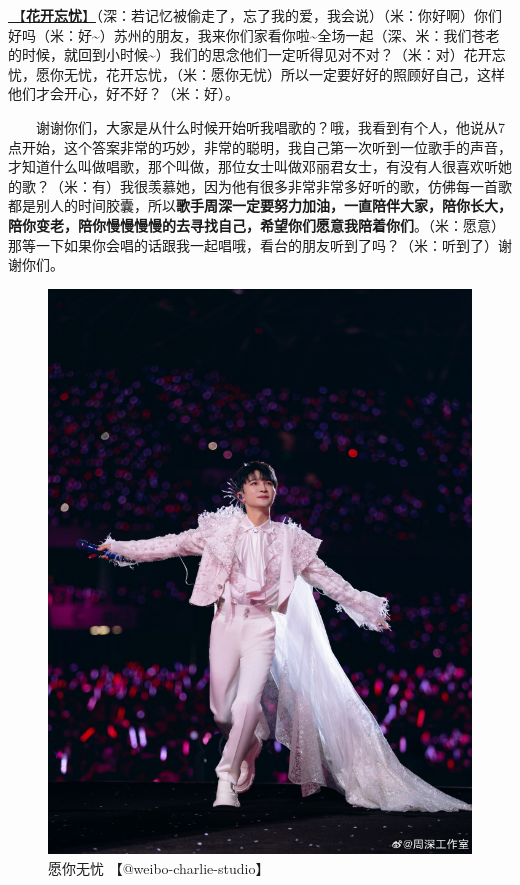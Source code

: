\documentclass[]{ctexbook}
\begin{document}
\hyperref[no-worries]{🎵【\textbf{花开忘忧}】}（深：若记忆被偷走了，忘了我的爱，我会说）（米：你好啊）你们好吗（米：好\textasciitilde）苏州的朋友，我来你们家看你啦\textasciitilde 全场一起（深、米：我们苍老的时候，就回到小时候\textasciitilde）我们的思念他们一定听得见对不对？（米：对）花开忘忧，愿你无忧，花开忘忧，（米：愿你无忧）所以一定要好好的照顾好自己，这样他们才会开心，好不好？（米：好）。

  谢谢你们，大家是从什么时候开始听我唱歌的？哦，我看到有个人，他说从7点开始，这个答案非常的巧妙，非常的聪明，我自己第一次听到一位歌手的声音，才知道什么叫做唱歌，那个叫做，那位女士叫做邓丽君女士，有没有人很喜欢听她的歌？（米：有）我很羡慕她，因为他有很多非常非常多好听的歌，仿佛每一首歌都是别人的时间胶囊，所以\textbf{歌手周深一定要努力加油，一直陪伴大家，陪你长大，陪你变老，陪你慢慢慢慢的去寻找自己，希望你们愿意我陪着你们}。（米：愿意）那等一下如果你会唱的话跟我一起唱哦，看台的朋友听到了吗？（米：听到了）谢谢你们。

\begin{figure}

{\centering \includegraphics[width=400pt]{img/suzhou20241109/003} 

}

\caption{愿你无忧 【@weibo-charlie-studio】}\label{fig:unnamed-chunk-128}
\end{figure}
\end{document}
